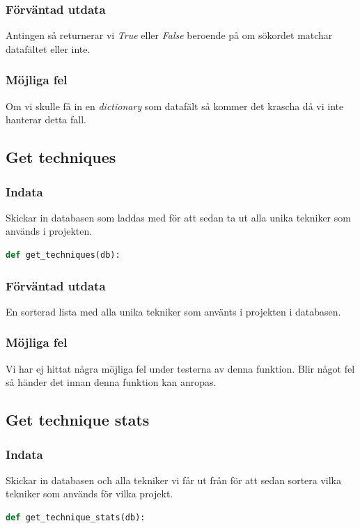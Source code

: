 \documentclass{TDP003mall}
\begin{document}
\subsubsection{Förväntad utdata}
Antingen så returnerar vi \textit{True} eller \textit{False} beroende på om sökordet matchar datafältet eller inte.
\subsubsection{Möjliga fel}
Om vi skulle få in en \textit{dictionary} som datafält så kommer det krascha då vi inte hanterar detta fall. 

\subsection{Get techniques}
\label{sec:gettechniques}
\subsubsection{Indata}
Skickar in databasen som laddas med \uline{} för att sedan ta ut alla unika tekniker som används i projekten.
\begin{lstlisting}[caption={Definering av get\_techniques()}, language={Python}]
def get_techniques(db):
\end{lstlisting}
\subsubsection{Förväntad utdata}
En sorterad lista med alla unika tekniker som använts i projekten i databasen.
\subsubsection{Möjliga fel}
Vi har ej hittat några möjliga fel under testerna av denna funktion. Blir något fel så händer det innan denna funktion kan anropas.

\subsection{Get technique stats}
\subsubsection{Indata}
Skickar in databasen och alla tekniker vi får ut från \uline{} för att sedan sortera vilka tekniker som används för vilka projekt.
\begin{lstlisting}[caption={Definering av get\_technique\_stats()}, language={Python}]
def get_technique_stats(db):
\end{lstlisting}
\end{document}
